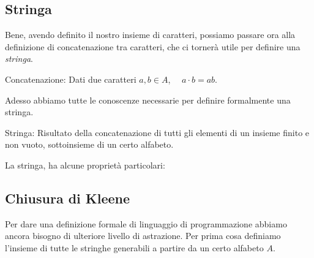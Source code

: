 \documentclass{article}
\begin{document}
\subsection{Stringa}
Bene, avendo definito il nostro insieme di caratteri, possiamo passare ora alla definizione di concatenazione tra caratteri, che ci tornerà utile per definire una \emph{stringa}.
\begin{dfn}{Concatenazione: }
    Dati due caratteri \(a, b \in A\), \(\quad a \cdot b = ab\).
\end{dfn}

Adesso abbiamo tutte le conoscenze necessarie per definire formalmente una stringa.
\begin{dfn}{Stringa: }
    Risultato della concatenazione di tutti gli elementi di un insieme finito e non vuoto, sottoinsieme di un certo alfabeto.
\end{dfn}

La stringa, ha alcune proprietà particolari:

\subsection{Chiusura di Kleene}
Per dare una definizione formale di linguaggio di programmazione abbiamo ancora bisogno di ulteriore livello di astrazione. Per prima cosa definiamo l'insieme di tutte le stringhe generabili a partire da un certo alfabeto \(A\).
\end{document}
